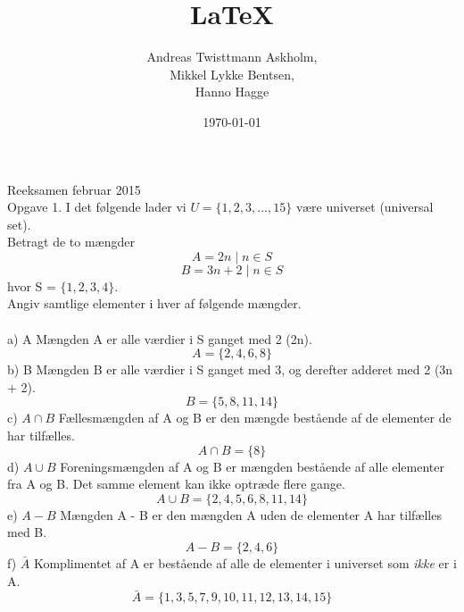 \documentclass[a4paper,12pt]{article}
\title{\LaTeX{}}
\author{Andreas Twisttmann Askholm, \\Mikkel Lykke Bentsen, \\Hanno Hagge}
\date{\today}
\begin{document}
\maketitle

Reeksamen februar 2015
\\ Opgave 1.
I det følgende lader vi $U = \lbrace1, 2, 3, . . . , 15\rbrace$ være universet (universal set).\\
Betragt de to mængder\\
$$A = {2n \mid n \in S}$$
$$B = {3n + 2 \mid n \in S}$$
hvor S = $\lbrace1, 2, 3, 4\rbrace.$ \\
Angiv samtlige elementer i hver af følgende mængder.
\\\\
a) A  \hspace{5mm} Mængden A er alle værdier i  S ganget med 2 (2n).$$ A = \lbrace 2, 4, 6, 8\rbrace$$
b) B \hspace{5mm} Mængden B er alle værdier i S ganget med 3, og derefter adderet med 2 (3n + 2). $$ B = \lbrace 5, 8, 11, 14 \rbrace$$
c) $A \cap B$ \hspace{5mm} Fællesmængden af A og B er den mængde bestående af de elementer de har tilfælles. $$ A \cap B = \lbrace8\rbrace$$
d) $A \cup B$ \hspace{5mm} Foreningsmængden af A og B er mængden bestående af alle elementer fra A og B. Det samme element kan ikke optræde flere gange. $$ A \cup B = \lbrace 2, 4, 5, 6, 8, 11, 14\rbrace$$
e) $A - B$ \hspace{5mm} Mængden A - B er den mængden A uden de elementer A har tilfælles med B. $$ A - B = \lbrace 2, 4, 6 \rbrace $$
f) $ \bar{A}$ \hspace{5mm} Komplimentet af A er bestående af alle de elementer i universet som \emph{ikke} er i A. $$ \bar{A} = \lbrace 1, 3, 5, 7, 9, 10, 11, 12, 13, 14, 15 \rbrace$$
\end{document}
